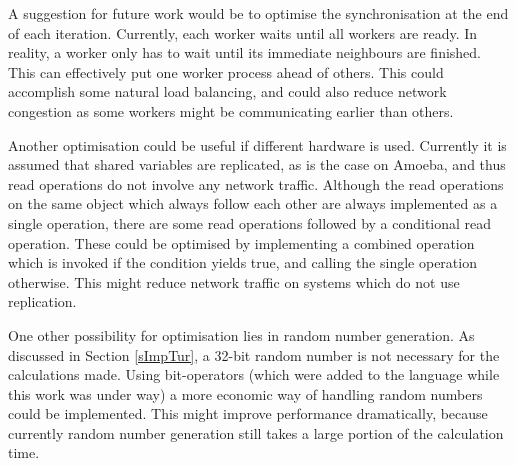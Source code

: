 A suggestion for future work would be to optimise the synchronisation
at the end of each iteration. Currently, each worker waits until all
workers are ready. In reality, a worker only has to wait until its
immediate 
neighbours are finished. This can effectively put one worker process ahead
of others. 
This could accomplish some natural load balancing, and could also reduce network
congestion as some workers might be communicating earlier than
others.

Another optimisation could be useful if different hardware is used.
Currently it is assumed that shared variables are replicated, as is
the case on Amoeba, and thus read operations do not 
involve any network traffic. Although the read operations on the same
object which always follow each other are always implemented as a
single
operation, there are some read operations followed by a conditional
read operation. These could be optimised by implementing a combined
operation which is invoked if the condition yields true, and calling
the single operation otherwise. This might reduce network traffic on
systems which do not use replication.

One other possibility for optimisation lies in random number
generation. As discussed in Section \ref{sImpTur}, a 32-bit random
number is not necessary for the calculations made. Using bit-operators
(which were added to the language while this work was under way)
a more economic way of
handling random numbers could be implemented. This might improve
performance dramatically, because currently random number generation
still takes a large portion of the calculation time.

